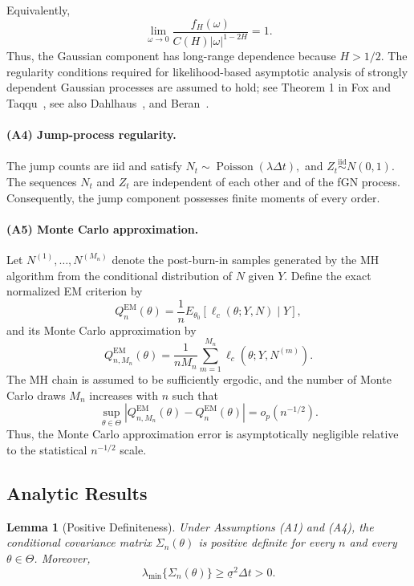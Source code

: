 \documentclass[a4paper,11pt]{amsart}
\newtheorem{lemma}{Lemma}
\theoremstyle{definition}
\theoremstyle{plain}
\theoremstyle{remark}
\newcommand{\1}{\mathbf{1}}
\begin{document}
Equivalently,
$$
\lim_{\omega\to0}
\frac{f_H(\omega)}
{C(H)|\omega|^{1-2H}}
=1.
$$
Thus, the Gaussian component has long-range dependence because $H>1/2$. The regularity conditions required for likelihood-based asymptotic analysis of strongly dependent Gaussian processes are assumed to hold; see Theorem 1 in Fox and Taqqu~\cite{FoxTaqqu1986}, see also Dahlhaus~\cite{Dahlhaus1989}, and Beran~\cite{Beran1994}.

\paragraph{(A4) Jump-process regularity.}
The jump counts are iid and satisfy
$
N_t\sim\operatorname{Poisson}(\lambda\Delta t),
$
and
$
Z_t\stackrel{\mathrm{iid}}{\sim}N(0,1).
$
The sequences ${N_t}$ and ${Z_t}$ are independent of each other and of the fGN process. Consequently, the jump component possesses finite moments of every order.

\paragraph{(A5) Monte Carlo approximation.}
Let
$
N^{(1)},\ldots,N^{(M_n)}
$
denote the post-burn-in samples generated by the MH algorithm from the conditional distribution of $N$ given $Y$. Define the exact normalized EM criterion by
$$
Q_n^{\mathrm{EM}}(\theta)
= \frac1n E_{\theta_0}\left[\ell_c(\theta;Y,N)\mid Y
\right],
$$
and its Monte Carlo approximation by
$$
Q_{n,M_n}^{\mathrm{EM}}(\theta)
= \frac{1}{nM_n}\sum_{m=1}^{M_n}\ell_c
\left(\theta;Y,N^{(m)}\right).
$$
The MH chain is assumed to be sufficiently ergodic, and the number of Monte Carlo draws $M_n$ increases with $n$ such that
$$
\sup_{\theta\in\Theta}
\left|
Q_{n,M_n}^{\mathrm{EM}}(\theta)
-
Q_n^{\mathrm{EM}}(\theta)
\right|
=
o_p(n^{-1/2}).
$$
Thus, the Monte Carlo approximation error is asymptotically negligible relative to the statistical $n^{-1/2}$ scale.

\subsection{Analytic Results}

\begin{lemma}[Positive Definiteness]
Under Assumptions (A1) and (A4), the conditional covariance matrix
$\Sigma_n(\theta)$ is positive definite for every
$n$ and every $\theta\in\Theta$. Moreover,
$$
\lambda_{\min}\{\Sigma_n(\theta)\}
\geq
\underline{\sigma}^2\Delta t>0.
$$
\end{lemma}
\end{document}
